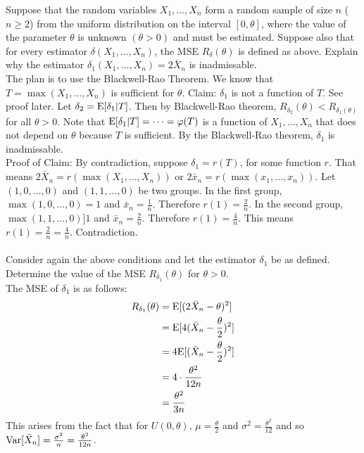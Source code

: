 \documentclass[12pt]{article}
\begin{document}
Suppose that the random variables $X_1,\dots, X_n$ form a random sample of size $n$ ($n\geq 2$) from the uniform distribution on the interval $[0,\theta]$, where the value of the parameter $\theta$ is unknown $(\theta > 0)$ and must be estimated. Suppose also that for every estimator $\delta(X_1,\dots,X_n)$, the MSE $R_\delta(\theta)$ is defined as above. Explain why the estimator $\delta_1(X_1,\dots,X_n) = 2\bar{X}_n$ is inadmissable. \\
The plan is to use the Blackwell-Rao Theorem. We know that $T = \max(X_1,\dots,X_n)$ is sufficient for $\theta$. Claim: $\delta_1$ is not a function of $T$. See proof later. Let $\delta_2 = \mathrm{E}[ \delta_1 | T ]$. Then by Blackwell-Rao theorem, $R_{\delta_2}(\theta) < R_{\delta_1(\theta)}$ for all $\theta > 0$. Note that $\mathrm{E}[ \delta_1 | T ] = \dots = \varphi(T)$ is a function of $X_1,\dots,X_n$ that does not depend on $\theta$ because $T$ is sufficient. By the Blackwell-Rao theorem, $\delta_1$ is inadmissable. \\ Proof of Claim: By contradiction, suppose $\delta_1 = r(T)$, for some function $r$. That means $2\bar{X}_n = r(\max(X_1,\dots,X_n))$ or $2\bar{x}_n = r(\max(x_1,\dots,x_n))$. Let $(1,0,\dots,0)$ and $(1,1,\dots,0)$ be two groups. In the first group, $\max(1,0,\dots,0) = 1$ and $\bar{x}_n = \frac{1}{n}$. Therefore $r(1) = \frac{2}{n}$. In the second group, $\max(1,1,\dots,0) ] 1$ and $\bar{x}_n = \frac{2}{n}$. Therefore $r(1) = \frac{4}{n}$. This means $r(1) = \frac{2}{n} = \frac{4}{n}$. Contradiction. \\~\\

Consider again the above conditions and let the estimator $\delta_1$ be as defined. Determine the value of the MSE $R_{\delta_1}(\theta)$ for $\theta > 0$. \\ 
The MSE of $\delta_1$ is as follows: $$ \begin{aligned} R_{\delta_1}(\theta) &= \mathrm{E}[ (2\bar{X}_n - \theta)^2 ] \\ &= \mathrm{E}[ 4(\bar{X}_n - \frac{\theta}{2})^2 ] \\ &= 4\mathrm{E}[ (\bar{X}_n - \frac{\theta}{2})^2 ] \\ &= 4 \cdot \frac{\theta^2}{12n} \\ &= \frac{\theta^2}{3n} \end{aligned} $$ 
This arises from the fact that for $U(0,\theta)$, $\mu = \frac{\theta}{2}$ and $\sigma^2 = \frac{\theta^2}{12}$ and so $\mathrm{Var}[ \bar{X}_n ] = \frac{\sigma^2}{n} = \frac{\theta^2}{12n} $. \\~\\
\end{document}
